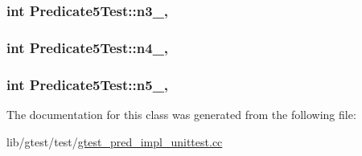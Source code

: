 \hypertarget{class_predicate5_test_a63723efb915dbf418c31b97b64dabc0e}{
\subsubsection[{n3\-\_\-}]{\setlength{\rightskip}{0pt plus 5cm}int Predicate5\-Test\-::n3\-\_\-\hspace{0.3cm}{\ttfamily [static]}, {\ttfamily [protected]}}}\label{class_predicate5_test_a63723efb915dbf418c31b97b64dabc0e}
\hypertarget{class_predicate5_test_a5d66aa58badddc8d3d8070a93c0558d6}{
\subsubsection[{n4\-\_\-}]{\setlength{\rightskip}{0pt plus 5cm}int Predicate5\-Test\-::n4\-\_\-\hspace{0.3cm}{\ttfamily [static]}, {\ttfamily [protected]}}}\label{class_predicate5_test_a5d66aa58badddc8d3d8070a93c0558d6}
\hypertarget{class_predicate5_test_a96badba6366235a2771b27ea014bd9ce}{
\subsubsection[{n5\-\_\-}]{\setlength{\rightskip}{0pt plus 5cm}int Predicate5\-Test\-::n5\-\_\-\hspace{0.3cm}{\ttfamily [static]}, {\ttfamily [protected]}}}\label{class_predicate5_test_a96badba6366235a2771b27ea014bd9ce}


The documentation for this class was generated from the following file\-:\begin{DoxyCompactItemize}
\item 
lib/gtest/test/\hyperlink{gtest__pred__impl__unittest_8cc}{gtest\-\_\-pred\-\_\-impl\-\_\-unittest.\-cc}\end{DoxyCompactItemize}
